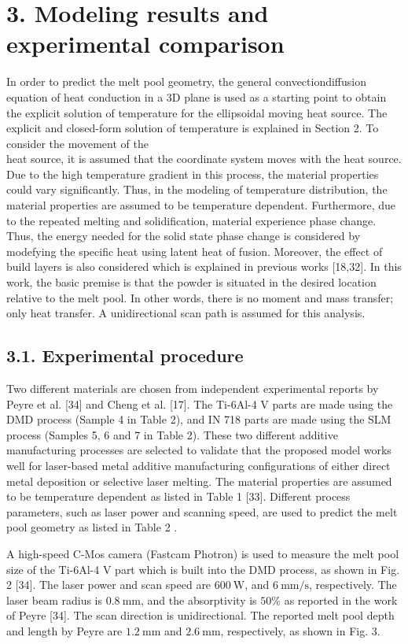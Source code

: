 \documentclass[10pt]{article}
\begin{document}
\section*{3. Modeling results and experimental comparison}
In order to predict the melt pool geometry, the general convectiondiffusion equation of heat conduction in a 3D plane is used as a starting point to obtain the explicit solution of temperature for the ellipsoidal moving heat source. The explicit and closed-form solution of temperature is explained in Section 2. To consider the movement of the\\
heat source, it is assumed that the coordinate system moves with the heat source. Due to the high temperature gradient in this process, the material properties could vary significantly. Thus, in the modeling of temperature distribution, the material properties are assumed to be temperature dependent. Furthermore, due to the repeated melting and solidification, material experience phase change. Thus, the energy needed for the solid state phase change is considered by modefying the specific heat using latent heat of fusion. Moreover, the effect of build layers is also considered which is explained in previous works [18,32]. In this work, the basic premise is that the powder is situated in the desired location relative to the melt pool. In other words, there is no moment and mass transfer; only heat transfer. A unidirectional scan path is assumed for this analysis.

\subsection*{3.1. Experimental procedure}
Two different materials are chosen from independent experimental reports by Peyre et al. [34] and Cheng et al. [17]. The Ti-6Al-4 V parts are made using the DMD process (Sample 4 in Table 2), and IN 718 parts are made using the SLM process (Samples 5, 6 and 7 in Table 2). These two different additive manufacturing processes are selected to validate that the proposed model works well for laser-based metal additive manufacturing configurations of either direct metal deposition or selective laser melting. The material properties are assumed to be temperature dependent as listed in Table 1 [33]. Different process parameters, such as laser power and scanning speed, are used to predict the melt pool geometry as listed in Table 2 .

A high-speed C-Mos camera (Fastcam Photron) is used to measure the melt pool size of the Ti-6Al-4 V part which is built into the DMD process, as shown in Fig. 2 [34]. The laser power and scan speed are $600 \mathrm{~W}$, and $6 \mathrm{~mm} / \mathrm{s}$, respectively. The laser beam radius is $0.8 \mathrm{~mm}$, and the absorptivity is $50 \%$ as reported in the work of Peyre [34]. The scan direction is unidirectional. The reported melt pool depth and length by Peyre are $1.2 \mathrm{~mm}$ and $2.6 \mathrm{~mm}$, respectively, as shown in Fig. 3.
\end{document}
